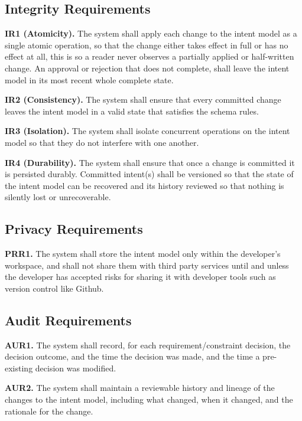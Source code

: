 \documentclass[12pt]{article}
\begin{document}
\subsection{Integrity Requirements}

\medskip
\noindent\textbf{IR1 (Atomicity).} The system shall apply each change 
to the intent model as a single atomic operation, so that the change
either takes effect in full or has no effect at all, this is so a reader never observes
a partially applied or half-written change. An approval or rejection that does
not complete, shall leave the intent model in its most recent whole complete state.

\medskip
\noindent\textbf{IR2 (Consistency).} The system shall ensure that every
committed change leaves the intent model in a valid state that satisfies the schema rules. 

\medskip
\noindent\textbf{IR3 (Isolation).} The system shall isolate concurrent
operations on the intent model so that they do not interfere
with one another. 

\medskip
\noindent\textbf{IR4 (Durability).} The system shall ensure that once a change is
committed it is persisted durably.
Committed intent(s) shall be versioned so that the state of the intent
model can be recovered and its history reviewed so that nothing is silently lost or unrecoverable.

\subsection{Privacy Requirements}

\medskip
\noindent\textbf{PRR1.} The system shall store the intent model only within the developer's workspace, 
and shall not share them with third party services until and unless the developer has accepted risks for sharing it with developer tools such as version control like Github.

\subsection{Audit Requirements}

\medskip
\noindent\textbf{AUR1.} The system shall record, for each requirement/constraint decision,
the decision outcome, and the time the decision was made, and the time a pre-existing decision was modified. 

\medskip
\noindent\textbf{AUR2.} The system shall maintain a reviewable history and lineage of the 
changes to the intent model, including what changed, when it changed, and the
rationale for the change.
\end{document}
